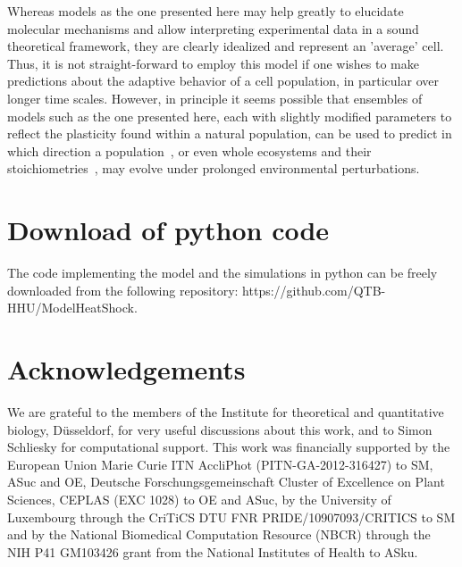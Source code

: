 \documentclass[oneside, 10pt, a4paper, twocolumn]{article}
\begin{document}
%

{Whereas models as the one presented here may help greatly to elucidate molecular mechanisms and allow interpreting
experimental data in a sound theoretical framework, they are clearly idealized and represent an 'average' cell. Thus, it is not
straight-forward to employ this model if one wishes to make predictions about the adaptive behavior of a cell population, in particular
over longer time scales. However, in principle it seems possible that ensembles of models such as the one presented here, 
each with slightly modified parameters to reflect the plasticity found within a natural population, 
can be used to predict in which direction a population~\cite{Kremer2018}, or even whole ecosystems and their 
stoichiometries~\cite{Yvon-Durocher2017}, may evolve under prolonged environmental 
perturbations.
}


\section*{Download of python code}

The code implementing the model and the simulations in python can be freely downloaded from the following repository: https://github.com/QTB-HHU/ModelHeatShock.


\section*{Acknowledgements}

We are grateful to the members of the Institute for theoretical and quantitative biology, Düsseldorf, for very useful discussions about this work, and to Simon Schliesky for  computational support.
This work was financially supported by the European Union Marie Curie ITN AccliPhot (PITN-GA-2012-316427) to SM, ASuc and OE, Deutsche Forschungsgemeinschaft Cluster of Excellence on Plant Sciences, CEPLAS (EXC 1028) to OE and ASuc, {by the University of Luxembourg through the CriTiCS DTU FNR PRIDE/10907093/CRITICS to SM} and by the National Biomedical Computation Resource (NBCR) through the NIH P41 GM103426 grant from the National Institutes of Health to ASku.
\end{document}
